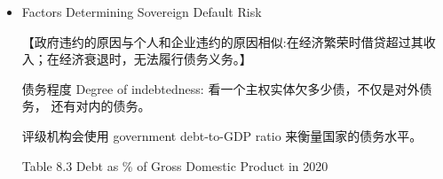 \begin{itemize}
\begin{itemize}
\begin{itemize}
    \item A loss of reputation along with an increased difficulty in raising funds for several years

    \item A lack of investors willing to buy the debt and equity of corporations based in the country

    \item An economic downturn (经济衰退)

\item Political instability as the population loses faith in its leaders

\item A default has a negative impact on GDP growth， has a negative impact on the country's credit rating for many years， can hurt exports， and can make the banking system of the defaulting country more vulnerable. 【违约对 GDP 增长有负面影响， 对该国的信用评级有多年的负面影响， 可能损害出口，并可能使违约国的银行系统更加脆弱。】
\end{itemize}

\item Factors Determining Sovereign Default Risk

【政府违约的原因与个人和企业违约的原因相似:在经济繁荣时借贷超过其收入；在经济衰退时，无法履行债务义务。】

 债务程度 Degree of indebtedness: 看一个主权实体欠多少债，不仅是对外债务， 还有对内的债务。

评级机构会使用 government debt-to-GDP ratio 来衡量国家的债务水平。

Table 8.3 Debt as \% of Gross Domestic Product in 2020


\end{itemize}
\end{itemize}
